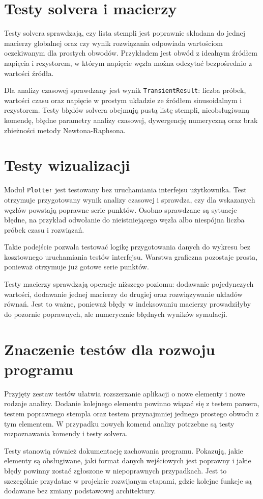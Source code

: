 \section{Testy solvera i macierzy}
\label{sec:testy-solvera}

Testy solvera sprawdzają, czy lista stempli jest poprawnie składana do jednej macierzy globalnej oraz czy wynik rozwiązania odpowiada wartościom oczekiwanym dla prostych obwodów. Przykładem jest obwód z idealnym źródłem napięcia i rezystorem, w którym napięcie węzła można odczytać bezpośrednio z wartości źródła.

Dla analizy czasowej sprawdzany jest wynik \texttt{TransientResult}: liczba próbek, wartości czasu oraz napięcie w prostym układzie ze źródłem sinusoidalnym i rezystorem. Testy błędów solvera obejmują pustą listę stempli, nieobsługiwaną komendę, błędne parametry analizy czasowej, dywergencję numeryczną oraz brak zbieżności metody Newtona-Raphsona.

\section{Testy wizualizacji}
\label{sec:testy-wizualizacji}

Moduł \texttt{Plotter} jest testowany bez uruchamiania interfejsu użytkownika. Test otrzymuje przygotowany wynik analizy czasowej i sprawdza, czy dla wskazanych węzłów powstają poprawne serie punktów. Osobno sprawdzane są sytuacje błędne, na przykład odwołanie do nieistniejącego węzła albo niespójna liczba próbek czasu i rozwiązań.

Takie podejście pozwala testować logikę przygotowania danych do wykresu bez kosztownego uruchamiania testów interfejsu. Warstwa graficzna pozostaje prosta, ponieważ otrzymuje już gotowe serie punktów.

Testy macierzy sprawdzają operacje niższego poziomu: dodawanie pojedynczych wartości, dodawanie jednej macierzy do drugiej oraz rozwiązywanie układów równań. Jest to ważne, ponieważ błędy w indeksowaniu macierzy prowadziłyby do pozornie poprawnych, ale numerycznie błędnych wyników symulacji.

\section{Znaczenie testów dla rozwoju programu}
\label{sec:znaczenie-testow}

Przyjęty zestaw testów ułatwia rozszerzanie aplikacji o nowe elementy i nowe rodzaje analizy. Dodanie kolejnego elementu powinno wiązać się z testem parsera, testem poprawnego stempla oraz testem przynajmniej jednego prostego obwodu z tym elementem. W przypadku nowych komend analizy potrzebne są testy rozpoznawania komendy i testy solvera.

Testy stanowią również dokumentację zachowania programu. Pokazują, jakie elementy są obsługiwane, jaki format danych wejściowych jest poprawny i jakie błędy powinny zostać zgłoszone w niepoprawnych przypadkach. Jest to szczególnie przydatne w projekcie rozwijanym etapami, gdzie kolejne funkcje są dodawane bez zmiany podstawowej architektury.
